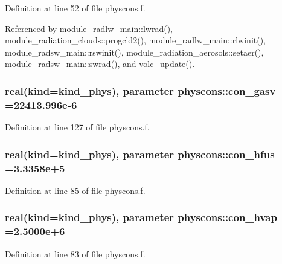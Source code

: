 Definition at line 52 of file physcons.\+f.



Referenced by module\+\_\+radlw\+\_\+main\+::lwrad(), module\+\_\+radiation\+\_\+clouds\+::progcld2(), module\+\_\+radlw\+\_\+main\+::rlwinit(), module\+\_\+radsw\+\_\+main\+::rswinit(), module\+\_\+radiation\+\_\+aerosols\+::setaer(), module\+\_\+radsw\+\_\+main\+::swrad(), and volc\+\_\+update().

\subsubsection[{\texorpdfstring{con\+\_\+gasv}{con_gasv}}]{\setlength{\rightskip}{0pt plus 5cm}real(kind=kind\+\_\+phys), parameter physcons\+::con\+\_\+gasv =22413.\+996e-\/6}\hypertarget{namespacephyscons_a154e74ee27785d0568c18955cb21f6ac}{}\label{namespacephyscons_a154e74ee27785d0568c18955cb21f6ac}


Definition at line 127 of file physcons.\+f.

\subsubsection[{\texorpdfstring{con\+\_\+hfus}{con_hfus}}]{\setlength{\rightskip}{0pt plus 5cm}real(kind=kind\+\_\+phys), parameter physcons\+::con\+\_\+hfus =3.\+3358e+5}\hypertarget{namespacephyscons_a6d9481f4395882116e2a26bc85a617a6}{}\label{namespacephyscons_a6d9481f4395882116e2a26bc85a617a6}


Definition at line 85 of file physcons.\+f.

\subsubsection[{\texorpdfstring{con\+\_\+hvap}{con_hvap}}]{\setlength{\rightskip}{0pt plus 5cm}real(kind=kind\+\_\+phys), parameter physcons\+::con\+\_\+hvap =2.\+5000e+6}\hypertarget{namespacephyscons_a65ec8e424f61ccfe8520bf7cc5c070f8}{}\label{namespacephyscons_a65ec8e424f61ccfe8520bf7cc5c070f8}


Definition at line 83 of file physcons.\+f.

